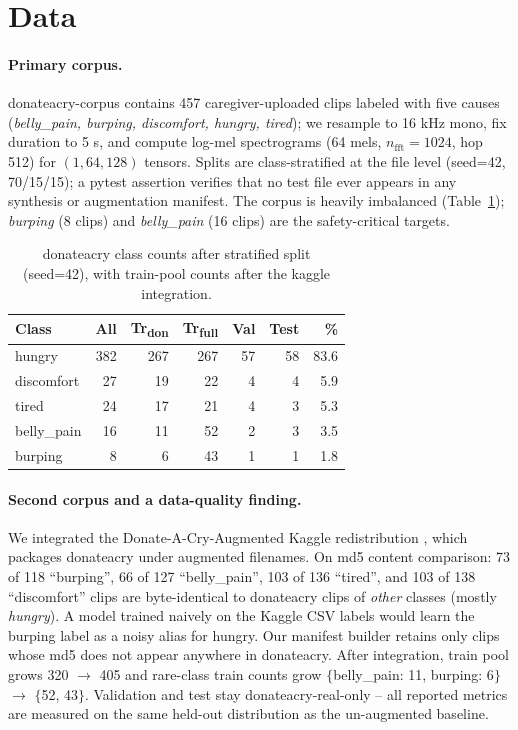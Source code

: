 \documentclass[pmlr,twocolumn,10pt]{jmlr}
\begin{document}
\section{Data}\label{sec:data}
\paragraph{Primary corpus.} donateacry-corpus contains 457 caregiver-uploaded clips labeled with five causes (\textit{belly\_pain, burping, discomfort, hungry, tired}); we resample to 16 kHz mono, fix duration to 5 s, and compute log-mel spectrograms (64 mels, $n_{\text{fft}}{=}1024$, hop 512) for $(1, 64, 128)$ tensors. Splits are class-stratified at the file level (seed=42, 70/15/15); a pytest assertion verifies that no test file ever appears in any synthesis or augmentation manifest. The corpus is heavily imbalanced (Table~\ref{tab:counts}); \textit{burping} (8 clips) and \textit{belly\_pain} (16 clips) are the safety-critical targets.

\begin{table}[H]
\centering
\footnotesize
\renewcommand{\arraystretch}{0.95}
\caption{donateacry class counts after stratified split (seed=42), with train-pool counts after the kaggle integration.}\label{tab:counts}
\begin{tabular}{lrrrrrr}
\toprule
Class & All & Tr\textsubscript{don} & Tr\textsubscript{full} & Val & Test & \% \\
\midrule
hungry      & 382 & 267 & 267 & 57 & 58 & 83.6 \\
discomfort  & 27  & 19  & 22  & 4  & 4  & 5.9 \\
tired       & 24  & 17  & 21  & 4  & 3  & 5.3 \\
belly\_pain & 16  & 11  & 52  & 2  & 3  & 3.5 \\
burping     & 8   & 6   & 43  & 1  & 1  & 1.8 \\
\bottomrule
\end{tabular}
\end{table}

\paragraph{Second corpus and a data-quality finding.} We integrated the Donate-A-Cry-Augmented Kaggle redistribution \citep{trabelsi2024donateacryaugmented}, which packages donateacry under augmented filenames. On md5 content comparison: 73 of 118 ``burping'', 66 of 127 ``belly\_pain'', 103 of 136 ``tired'', and 103 of 138 ``discomfort'' clips are byte-identical to donateacry clips of \emph{other} classes (mostly \textit{hungry}). A model trained naively on the Kaggle CSV labels would learn the burping label as a noisy alias for hungry. Our manifest builder retains only clips whose md5 does not appear anywhere in donateacry. After integration, train pool grows 320 $\to$ 405 and rare-class train counts grow $\{$belly\_pain: 11, burping: 6$\}$ $\to$ $\{$52, 43$\}$. Validation and test stay donateacry-real-only -- all reported metrics are measured on the same held-out distribution as the un-augmented baseline.
\end{document}
